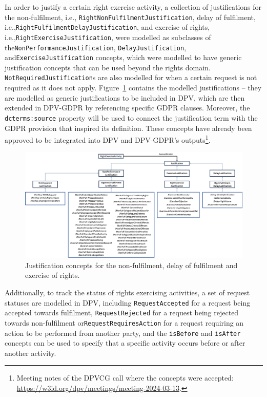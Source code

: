 In order to justify a certain right exercise activity, a collection of justifications for the non-fulfilment, i.e., \texttt{RightNonFulfilmentJustification}, delay of fulfilment, i.e.,\linebreak \texttt{RightFulfilmentDelayJustification}, and exercise of rights, i.e.,\linebreak \texttt{RightExerciseJustification}, were modelled as subclasses of the\linebreak \texttt{NonPerformanceJustification}, \texttt{DelayJustification}, and\linebreak \texttt{ExerciseJustification} concepts, which were modelled to have generic justification concepts that can be used beyond the rights domain.
\texttt{NotRequiredJustification}s are also modelled for when a certain request is not required as it does not apply. 
Figure~\ref{fig:justifications} contains the modelled justifications -- they are modelled as generic justifications to be included in DPV, which are then extended in DPV-GDPR by referencing specific GDPR clauses.
Moreover, the \texttt{dcterms:source} property will be used to connect the justification term with the GDPR provision that inspired its definition. 
These concepts have already been approved to be integrated into DPV and DPV-GDPR's outputs\footnote{Meeting notes of the DPVCG call where the concepts were accepted: \url{https://w3id.org/dpv/meetings/meeting-2024-03-13}.}.

\begin{figure}[ht]
    \centering
    \includegraphics[width=\linewidth]{figures/chapter-4/justifications.png}
    \caption[Justification concepts.]{Justification concepts for the non-fulfilment, delay of fulfilment and exercise of rights.}
    \label{fig:justifications}
\end{figure}

Additionally, to track the status of rights exercising activities, a set of request statuses are modelled in DPV, including \texttt{RequestAccepted} for a request being accepted towards fulfilment, \texttt{RequestRejected} for a request being rejected towards non-fulfilment or\linebreak \texttt{RequestRequiresAction} for a request requiring an action to be performed from another party, and the \texttt{isBefore} and \texttt{isAfter} concepts can be used to specify that a specific activity occurs before or after another activity.

